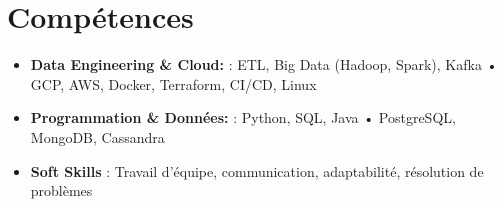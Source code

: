 \documentclass[11pt,a4paper,sans]{moderncv}
\begin{document}
  \vspace{-11pt}
  \section{\fontsize{11}\selectfont Compétences}
  \vspace{-6pt}
  \begin{itemize}[leftmargin=0cm, itemsep=-2pt, topsep=0pt, partopsep=0pt, parsep=0pt, label={}]
    \item \textbf{Data Engineering & Cloud:} : ETL, Big Data (Hadoop, Spark), Kafka • GCP, AWS, Docker, Terraform, CI/CD, Linux
    \item \textbf{Programmation & Données:} : Python, SQL, Java • PostgreSQL, MongoDB, Cassandra
    \item \textbf{Soft Skills} : Travail d’équipe, communication, adaptabilité, résolution de problèmes
  \end{itemize} 

 

  
\end{document}

